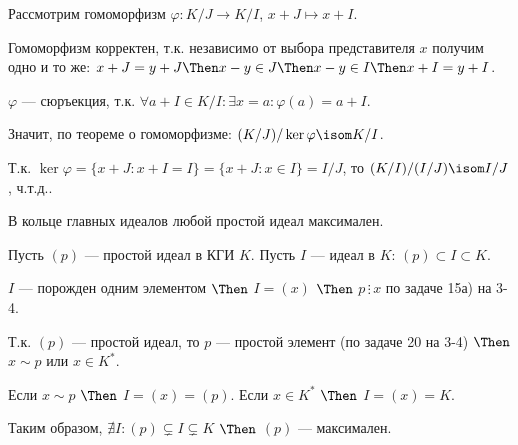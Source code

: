 \begin{solution}

Рассмотрим гомоморфизм $\varphi: K/J \to K/I$, $x + J \mapsto x + I$.

Гомоморфизм корректен, т.к. независимо от выбора представителя $x$ получим одно и то же: $x + J = y + J \Then x - y \in J \Then x - y \in I \Then x + I = y + I$.

$\varphi$ --- сюръекция, т.к. $\forall a + I \in K/I: \exists x = a: \varphi(a) = a + I$.

Значит, по теореме о гомоморфизме: $(K/J) / \ker \varphi \isom K/I$. 

Т.к. $\ker \varphi = \{x + J: x + I = I\}  = \{x + J: x \in I \} = I / J$, то $(K/I)/(I/J) \isom I/J$, ч.т.д..

\end{solution}


\begin{problem}[19 (4.9)]
	
В кольце главных идеалов любой простой идеал максимален.

\end{problem}

\begin{solution}
	
Пусть $(p)$ --- простой идеал в КГИ $K$. Пусть $I$ --- идеал в $K$: $(p) \subset I \subset K$.

$I$ --- порожден одним элементом $\Then$ $I = (x)$ $\Then$ $p \,\vdots\, x$ по задаче 15а) на 3-4.

Т.к. $(p)$ --- простой идеал, то $p$ --- простой элемент (по задаче 20 на 3-4) $\Then$ $x \sim p$ или $x \in K^*$.

Если $x \sim p$ $\Then$ $I = (x) = (p)$. Если $x \in K^*$ $\Then$ $I = (x) = K$.

Таким образом, $\nexists I: (p) \subsetneq I \subsetneq K$ $\Then$ $(p)$ --- максимален.
	
\end{solution}

